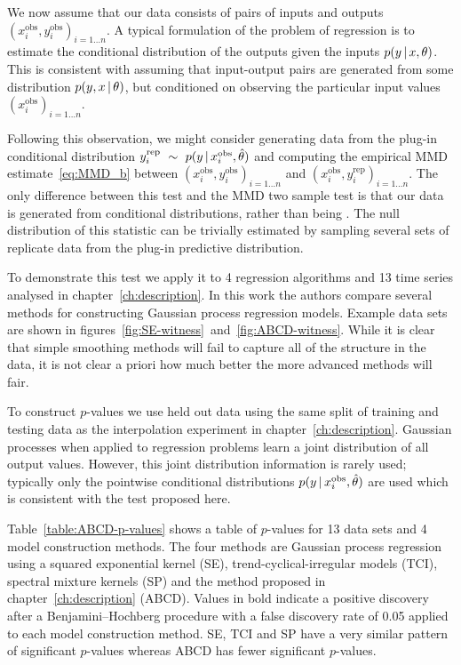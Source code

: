 We now assume that our data consists of pairs of inputs and outputs ${(x_i^\textrm{obs}, y_i^\textrm{obs})_{i=1\ldots n}}$.
A typical formulation of the problem of regression is to estimate the conditional distribution of the outputs given the inputs ${p(y\,|\, x, \theta)}$.
This is consistent with assuming that input-output pairs are generated \iid from some distribution ${p(y, x \,|\, \theta)}$, but conditioned on observing the particular input values ${(x_i^\textrm{obs})_{i=1\ldots n}}$.

Following this observation, we might consider generating data from the plug-in conditional distribution ${y_i^\textrm{rep} \ \sim\  p(y\,|\, x_i^\textrm{obs}, \hat\theta)}$ and computing the empirical MMD estimate~\eqref{eq:MMD_b} between ${(x_i^\textrm{obs}, y_i^\textrm{obs})_{i=1\ldots n}}$ and ${(x_i^\textrm{obs}, y_i^\textrm{rep})_{i=1\ldots n}}$.
The only difference between this test and the MMD two sample test is that our data is generated from conditional distributions, rather than being \iid.
The null distribution of this statistic can be trivially estimated by sampling several sets of replicate data from the plug-in predictive distribution.

To demonstrate this test we apply it to 4 regression algorithms and 13 time series analysed in chapter~\ref{ch:description}.
In this work the authors compare several methods for constructing Gaussian process \citep[e.g.][]{Rasmussen2006-ml} regression models.
Example data sets are shown in figures~\ref{fig:SE-witness}~and~\ref{fig:ABCD-witness}.
While it is clear that simple smoothing methods will fail to capture all of the structure in the data, it is not clear a priori how much better the more advanced methods will fair.

To construct $p$-values we use held out data using the same split of training and testing data as the interpolation experiment in chapter~\ref{ch:description}.
Gaussian processes when applied to regression problems learn a joint distribution of all output values.
However, this joint distribution information is rarely used; typically only the pointwise conditional distributions ${p(y\,|\, x_i^\textrm{obs}, \hat\theta)}$ are used which is consistent with the test proposed here.

Table~\ref{table:ABCD-p-values} shows a table of $p$-values for 13 data sets and 4 model construction methods.
The four methods are Gaussian process regression using a squared exponential kernel (SE), trend-cyclical-irregular models \citep[e.g.][]{Lind2006-th} (TCI), spectral mixture kernels \citep{Wilson2013-eq} (SP) and the method proposed in chapter~\ref{ch:description} (ABCD).
Values in  bold indicate a positive discovery after a Benjamini--Hochberg \citep{Benjamini_undated-mh} procedure with a false discovery rate of 0.05 applied to each model construction method.
SE, TCI and SP have a very similar pattern of significant $p$-values whereas ABCD has fewer significant $p$-values.

